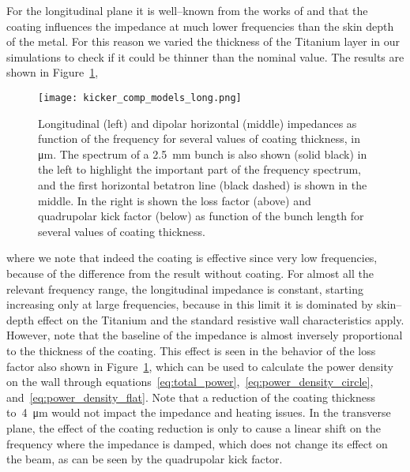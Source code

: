     For the longitudinal plane it is well--known from the works of  and  that the coating influences the impedance at much lower frequencies than the skin depth of the metal. For this reason we varied the thickness of the Titanium layer in our simulations to check if it could be thinner than the nominal value. The results are shown in Figure~\ref{fig:kicker_comp_models_long},
    \begin{figure}
        \centering
        \texttt{[image: kicker\_comp\_models\_long.png]}
        \caption[Titanium coating thickness effect on impedance.]{Longitudinal (left) and dipolar horizontal (middle) impedances as function of the frequency for several values of coating thickness, in \si{\micro\meter}. The spectrum of a \SI{2.5}{\milli\meter} bunch is also shown (solid black) in the left to highlight the important part of the frequency spectrum, and the first horizontal betatron line (black dashed) is shown in the middle. In the right is shown the loss factor (above) and quadrupolar kick factor (below) as function of the bunch length for several values of coating thickness.}
        \label{fig:kicker_comp_models_long}
    \end{figure}
    where we note that indeed the coating is effective since very low frequencies, because of the difference from the result without coating. For almost all the relevant frequency range, the longitudinal impedance is constant, starting increasing only at large frequencies, because in this limit it is dominated by skin--depth effect on the Titanium and the standard resistive wall characteristics apply. However, note that the baseline of the impedance is almost inversely proportional to the thickness of the coating. This effect is seen in the behavior of the loss factor also shown in Figure~\ref{fig:kicker_comp_models_long}, which can be used to calculate the power density on the wall through equations~\eqref{eq:total_power},~\eqref{eq:power_density_circle}, and~\eqref{eq:power_density_flat}. Note that a reduction of the coating thickness to~\SI{4}{\micro\meter} would not impact the impedance and heating issues. In the transverse plane, the effect of the coating reduction is only to cause a linear shift on the frequency where the impedance is damped, which does not change its effect on the beam, as can be seen by the quadrupolar kick factor.

